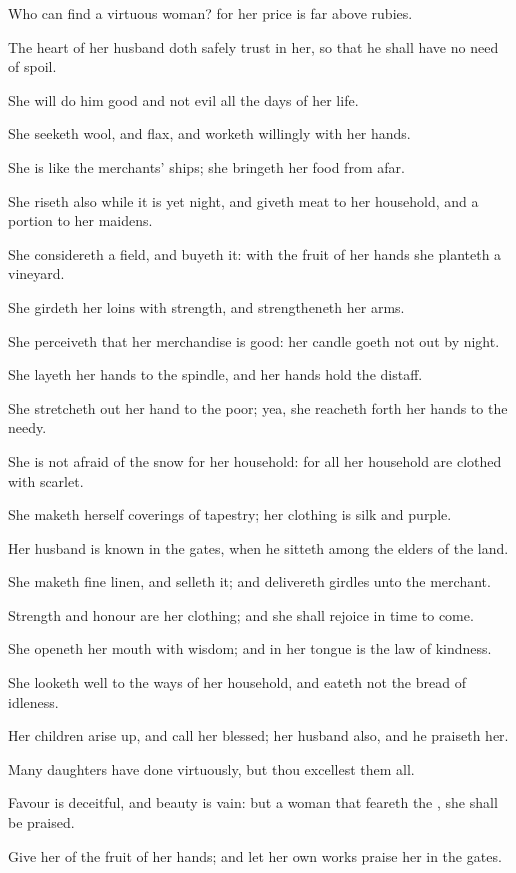 \Verse Who can find a virtuous woman? for her price is far above rubies.

\Verse The heart of her husband doth safely trust in her, so that he shall have no need of spoil.

\Verse She will do him good and not evil all the days of her life.

\Verse She seeketh wool, and flax, and worketh willingly with her hands.

\Verse She is like the merchants' ships; she bringeth her food from afar.

\Verse She riseth also while it is yet night, and giveth meat to her household, and a portion to her maidens.

\Verse She considereth a field, and buyeth it: with the fruit of her hands she planteth a vineyard.

\Verse She girdeth her loins with strength, and strengtheneth her arms.

\Verse She perceiveth that her merchandise is good: her candle goeth not out by night.

\Verse She layeth her hands to the spindle, and her hands hold the distaff.

\Verse She stretcheth out her hand to the poor; yea, she reacheth forth her hands to the needy.

\Verse She is not afraid of the snow for her household: for all her household are clothed with scarlet.

\Verse She maketh herself coverings of tapestry; her clothing is silk and purple.

\Verse Her husband is known in the gates, when he sitteth among the elders of the land.

\Verse She maketh fine linen, and selleth it; and delivereth girdles unto the merchant.

\Verse Strength and honour are her clothing; and she shall rejoice in time to come.

\Verse She openeth her mouth with wisdom; and in her tongue is the law of kindness.

\Verse She looketh well to the ways of her household, and eateth not the bread of idleness.

\Verse Her children arise up, and call her blessed; her husband also, and he praiseth her.

\Verse Many daughters have done virtuously, but thou excellest them all.

\Verse Favour is deceitful, and beauty is vain: but a woman that feareth the \LORD, she shall be praised.

\Verse Give her of the fruit of her hands; and let her own works praise her in the gates.

